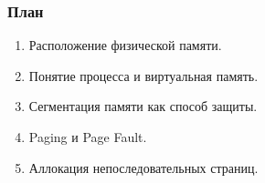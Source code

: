 \begin{frame}
\frametitle{План}

\begin{enumerate}
  \item Расположение физической памяти.
  \item Понятие процесса и виртуальная память.
  \item Сегментация памяти как способ защиты.
  \item Paging и Page Fault.
  \item Аллокация непоследовательных страниц.
\end{enumerate}
\end{frame}
